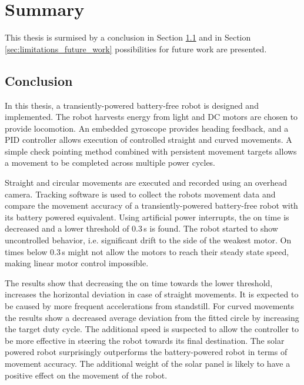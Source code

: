 \chapter{Summary}
\label{chp:summary}

This thesis is surmised by a conclusion in Section \ref{sec:conclusion} and in Section \ref{sec:limitations_future_work} possibilities for future work are presented.

\section{Conclusion}
\label{sec:conclusion}

In this thesis, a transiently-powered battery-free robot is designed and implemented.
The robot harvests energy from light and DC motors are chosen to provide locomotion.
An embedded gyroscope provides heading feedback, and a PID controller allows execution of controlled straight and curved movements.
A simple check pointing method combined with persistent movement targets allows a movement to be completed across multiple power cycles.

Straight and circular movements are executed and recorded using an overhead camera.
Tracking software is used to collect the robots movement data and compare the movement accuracy of a transiently-powered battery-free robot with its battery powered equivalent.
Using artificial power interrupts, the on time is decreased and a lower threshold of 0.3\,s is found.
The robot started to show uncontrolled behavior, i.e. significant drift to the side of the weakest motor.
On times below 0.3\,s might not allow the motors to reach their steady state speed, making linear motor control impossible.

The results show that decreasing the on time towards the lower threshold, increases the horizontal deviation in case of straight movements.
It is expected to be caused by more frequent accelerations from standstill.
For curved movements the results show a decreased average deviation from the fitted circle by increasing the target duty cycle.
The additional speed is suspected to allow the controller to be more effective in steering the robot towards its final destination.
The solar powered robot surprisingly outperforms the battery-powered robot in terms of movement accuracy.
The additional weight of the solar panel is likely to have a positive effect on the movement of the robot.


